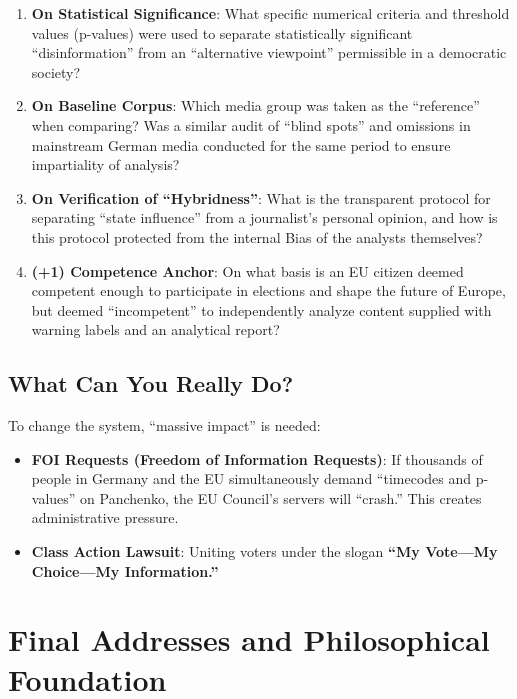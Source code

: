 \documentclass[11pt,a4paper]{article}
\theoremstyle{definition}
\theoremstyle{remark}
\begin{document}
\begin{enumerate}
\item \textbf{On Statistical Significance}: What specific numerical criteria and threshold values (p-values) were used to separate statistically significant ``disinformation'' from an ``alternative viewpoint'' permissible in a democratic society?

\item \textbf{On Baseline Corpus}: Which media group was taken as the ``reference'' when comparing? Was a similar audit of ``blind spots'' and omissions in mainstream German media conducted for the same period to ensure impartiality of analysis?

\item \textbf{On Verification of ``Hybridness''}: What is the transparent protocol for separating ``state influence'' from a journalist's personal opinion, and how is this protocol protected from the internal Bias of the analysts themselves?

\item \textbf{(+1) Competence Anchor}: On what basis is an EU citizen deemed competent enough to participate in elections and shape the future of Europe, but deemed ``incompetent'' to independently analyze content supplied with warning labels and an analytical report?
\end{enumerate}

\subsection{What Can You Really Do?}

To change the system, ``massive impact'' is needed:

\begin{itemize}
\item \textbf{FOI Requests (Freedom of Information Requests)}: If thousands of people in Germany and the EU simultaneously demand ``timecodes and p-values'' on Panchenko, the EU Council's servers will ``crash.'' This creates administrative pressure.

\item \textbf{Class Action Lawsuit}: Uniting voters under the slogan \textbf{``My Vote—My Choice—My Information.''}
\end{itemize}

\section{Final Addresses and Philosophical Foundation}
\label{sec:final_addresses}
\end{document}
